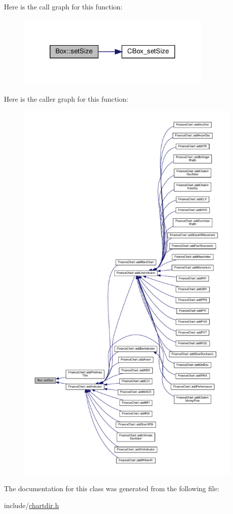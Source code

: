 Here is the call graph for this function\+:
\nopagebreak
\begin{figure}[H]
\begin{center}
\leavevmode
\includegraphics[width=269pt]{class_box_a2ec3e1cb522c938cf6927fcb41389bc3_cgraph}
\end{center}
\end{figure}
Here is the caller graph for this function\+:
\nopagebreak
\begin{figure}[H]
\begin{center}
\leavevmode
\includegraphics[height=550pt]{class_box_a2ec3e1cb522c938cf6927fcb41389bc3_icgraph}
\end{center}
\end{figure}


The documentation for this class was generated from the following file\+:\begin{DoxyCompactItemize}
\item 
include/\hyperlink{chartdir_8h}{chartdir.\+h}\end{DoxyCompactItemize}
